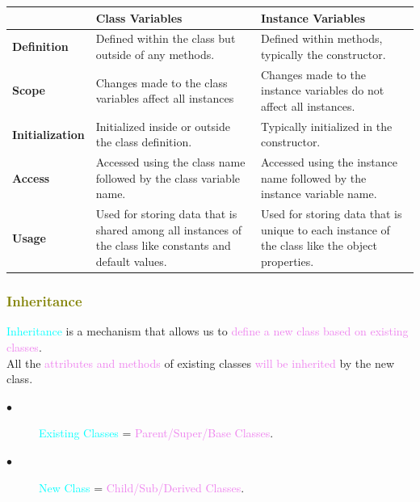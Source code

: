 \documentclass{book}
\begin{document}
    \begin{center}
        \begin{tabular}{|m{2.1cm}|m{8.5cm}|m{8.5cm}|}
            \hline
            \rowcolor{lightblue}
            & \textbf{Class Variables} & \textbf{Instance Variables} \\
            \hline
            \textbf{Definition} & Defined within the class but outside of any methods. & Defined within methods, typically the constructor. \\
            \hline
            \textbf{Scope} & Changes made to the class variables affect all instances & Changes made to the instance variables do not affect all instances. \\
            \hline
            \textbf{Initialization} & Initialized inside or outside the class definition. & Typically initialized in the constructor. \\
            \hline
            \textbf{Access} & Accessed using the class name followed by the class variable name. & Accessed using the instance name followed by the instance variable name. \\
            \hline
            \textbf{Usage} & Used for storing data that is shared among all instances of the class like constants and default values. & Used for storing data that is unique to each instance of the class like the object properties. \\
            \hline
        \end{tabular}
    \end{center}
    \textcolor{olive}{\subsubsection{Inheritance}}
    \textcolor{cyan}{Inheritance} is a mechanism that allows us to \textcolor{violet}{define a new class based on existing classes}.\\
    All the \textcolor{violet}{attributes and methods} of existing classes \textcolor{violet}{will be inherited} by the new class.
    \begin{description}
        \item[$\bullet$] \textcolor{cyan}{Existing Classes} = \textcolor{violet}{Parent/Super/Base Classes}.
        \item[$\bullet$] \textcolor{cyan}{New Class} = \textcolor{violet}{Child/Sub/Derived Classes}.
    \end{description}
\end{document}
